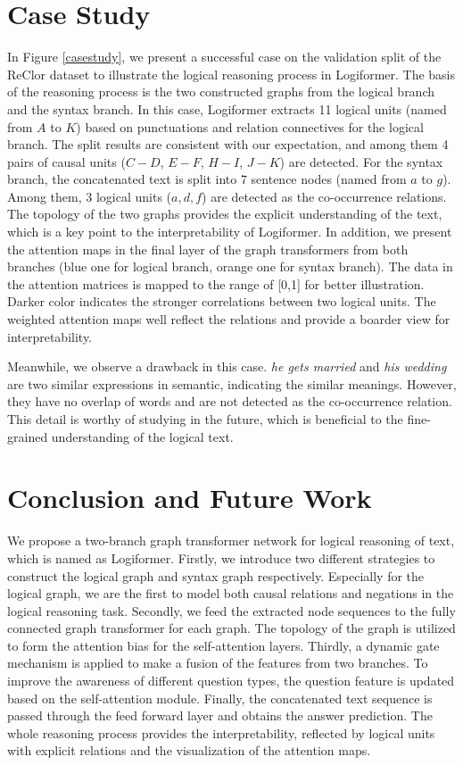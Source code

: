 \documentclass[sigconf]{acmart}
\begin{document}
\vspace{-0.1cm}
\section{Case Study}
In Figure \ref{casestudy}, we present a successful case on the validation split 
of the ReClor dataset to illustrate the logical reasoning process in 
Logiformer. The basis of the reasoning process is the two constructed graphs 
from the logical branch and the syntax branch. In this case, Logiformer 
extracts 11 logical units (named from $A$ to $K$) based on punctuations and 
relation connectives for the logical branch. The split results are consistent 
with our expectation, and among them 4 pairs of causal units ($C-D$, $E-F$, 
$H-I$, $J-K$) are detected. For the syntax branch, the concatenated text is 
split into 7 sentence nodes (named from $a$ to $g$). Among them, 3 logical 
units ($a,d,f$) are detected as the co-occurrence relations. The topology of 
the two graphs provides the explicit understanding of the text, which is a key 
point to the interpretability of Logiformer. In addition, we present the 
attention maps in the final layer of the graph transformers from both branches 
(blue one for logical branch, orange one for syntax branch). The data in the 
attention matrices is mapped to the range of [0,1] for better illustration. 
Darker color indicates the stronger correlations between two logical units. The 
weighted attention maps well reflect the relations and provide a boarder view 
for interpretability.

Meanwhile, we observe a drawback in this case. \textit{he gets married} and \textit{his wedding} are two similar expressions in semantic, indicating the similar meanings. However, they have no overlap of words and are not detected as the co-occurrence relation. This detail is worthy of studying in the future, which is beneficial to the fine-grained understanding of the logical text.

\vspace{-0.1cm}
\section{Conclusion and Future Work}
We propose a two-branch graph transformer network for logical reasoning of 
text, which is named as Logiformer. Firstly, we introduce two different 
strategies to construct the logical graph and syntax graph respectively. 
Especially for the logical graph, we are the first to model both causal 
relations and negations in the logical reasoning task. Secondly, we feed the 
extracted node sequences to the fully connected graph transformer for each 
graph. The topology of the graph is utilized to form the attention bias for the 
self-attention layers. Thirdly, a dynamic gate mechanism is applied to make a 
fusion of the features from two branches. To improve the awareness of different 
question types, the question feature is updated based on the self-attention 
module. Finally, the concatenated text sequence is passed through the feed 
forward layer and obtains the answer prediction. The whole reasoning process 
provides the interpretability, reflected by logical units with explicit 
relations and the visualization of the attention maps.
\end{document}
